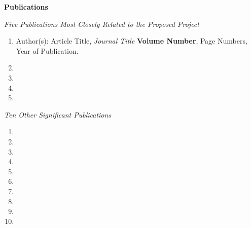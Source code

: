 

\vspace{12pt}
{\bf  Publications}

\vspace{12pt}
\emph{Five Publications Most Closely Related to the Proposed Project}

\begin{enumerate}
\item Author(s): Article Title, \emph{Journal Title} {\bf Volume Number}, Page Numbers, Year of Publication.

\item

\item

\item

\item
\end{enumerate}

\vspace{12pt}
\emph{Ten Other Significant Publications}

\begin{enumerate}
\item

\item

\item

\item

\item

\item

\item

\item

\item

\item
\end{enumerate}

